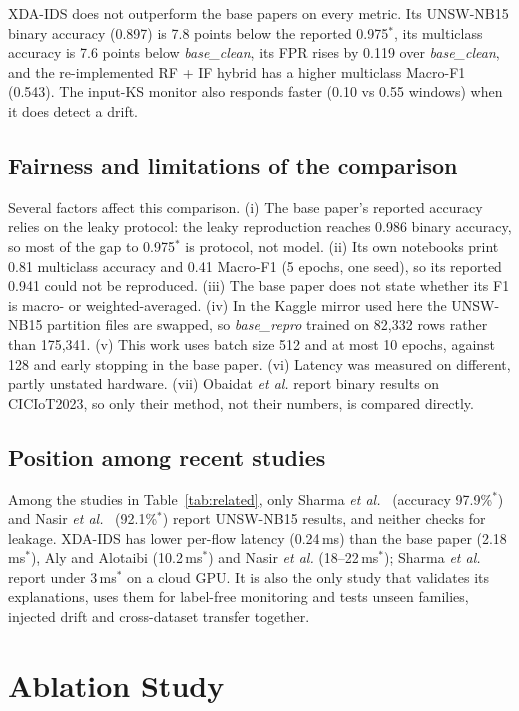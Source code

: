 \documentclass[conference]{IEEEtran}
\begin{document}
XDA-IDS does not outperform the base papers on every metric. Its UNSW-NB15 binary accuracy (0.897) is 7.8 points below the reported 0.975$^{*}$, its multiclass accuracy is 7.6 points below \textit{base\_clean}, its FPR rises by 0.119 over \textit{base\_clean}, and the re-implemented RF + IF hybrid has a higher multiclass Macro-F1 (0.543). The input-KS monitor also responds faster (0.10 vs 0.55 windows) when it does detect a drift.

\subsection{Fairness and limitations of the comparison}
Several factors affect this comparison. (i) The base paper's reported accuracy relies on the leaky protocol: the leaky reproduction reaches 0.986 binary accuracy, so most of the gap to 0.975$^{*}$ is protocol, not model. (ii) Its own notebooks print 0.81 multiclass accuracy and 0.41 Macro-F1 (5 epochs, one seed), so its reported 0.941 could not be reproduced. (iii) The base paper does not state whether its F1 is macro- or weighted-averaged. (iv) In the Kaggle mirror used here the UNSW-NB15 partition files are swapped, so \textit{base\_repro} trained on 82{,}332 rows rather than 175{,}341. (v) This work uses batch size 512 and at most 10 epochs, against 128 and early stopping in the base paper. (vi) Latency was measured on different, partly unstated hardware. (vii) Obaidat \textit{et al.} report binary results on CICIoT2023, so only their method, not their numbers, is compared directly.

\subsection{Position among recent studies}
Among the studies in Table~\ref{tab:related}, only Sharma \textit{et al.}~\cite{sharma2025} (accuracy 97.9\%$^{*}$) and Nasir \textit{et al.}~\cite{nasir2026} (92.1\%$^{*}$) report UNSW-NB15 results, and neither checks for leakage. XDA-IDS has lower per-flow latency (0.24\,ms) than the base paper (2.18\,ms$^{*}$), Aly and Alotaibi (10.2\,ms$^{*}$) and Nasir \textit{et al.} (18--22\,ms$^{*}$); Sharma \textit{et al.} report under 3\,ms$^{*}$ on a cloud GPU. It is also the only study that validates its explanations, uses them for label-free monitoring and tests unseen families, injected drift and cross-dataset transfer together.

\section{Ablation Study}\label{sec:ablation}
\end{document}
